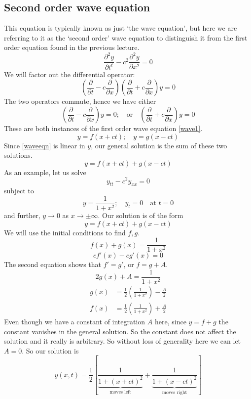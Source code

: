 \subsection{Second order wave equation}
This equation is typically known as just `the wave equation', but here we are referring to it as the `second order' wave equation to distinguish it from the first order equation found in the previous lecture.
\begin{equation}\label{waveeqn}
	\frac{\partial^2 y}{\partial t^t} - c^2 \frac{\partial^2 y}{\partial x^2} = 0
\end{equation}
We will factor out the differential operator:
\[
	\left( \frac{\partial}{\partial t} - c\frac{\partial}{\partial x} \right)\left( \frac{\partial}{\partial t} + c\frac{\partial}{\partial x} \right)y = 0
\]
The two operators commute, hence we have either
\[
	\left( \frac{\partial}{\partial t} - c\frac{\partial}{\partial x} \right) y = 0;\quad\text{or}\quad \left( \frac{\partial}{\partial t} + c\frac{\partial}{\partial x} \right) y = 0
\]
These are both instances of the first order wave equation \eqref{wave1}.
\[
	y = f(x+ct);\quad y=g(x-ct)
\]
Since \eqref{waveeqn} is linear in \(y\), our general solution is the sum of these two solutions.
\[
	y = f(x+ct) + g(x-ct)
\]
As an example, let us solve
\[
	y_{tt} - c^2 y_{xx} = 0
\]
subject to
\[
	y = \frac{1}{1+x^2}; \quad y_t = 0\quad \text{at }t=0
\]
and further, \(y \to 0\) as \(x \to \pm \infty\).
Our solution is of the form
\[
	y = f(x+ct) + g(x-ct)
\]
We will use the initial conditions to find \(f, g\).
\[
	f(x) + g(x) = \frac{1}{1+x^2}
\]
\[
	cf'(x) - cg'(x) = 0
\]
The second equation shows that \(f'=g'\), or \(f=g+A\).
\[
	2g(x) + A = \frac{1}{1+x^2}
\]
\begin{align*}
	g(x) & = \frac{1}{2}\left( \frac{1}{1+x^2} \right) - \frac{A}{2} \\
	f(x) & = \frac{1}{2}\left( \frac{1}{1+x^2} \right) + \frac{A}{2}
\end{align*}
Even though we have a constant of integration \(A\) here, since \(y=f+g\) the constant vanishes in the general solution.
So the constant does not affect the solution and it really is arbitrary.
So without loss of generality here we can let \(A = 0\).
So our solution is
\[
	y(x, t) = \frac{1}{2}\left[ \underbrace{\frac{1}{1+(x+ct)^2}}_{\text{moves left}} + \underbrace{\frac{1}{1+(x-ct)^2}}_{\text{moves right}} \right]
\]

